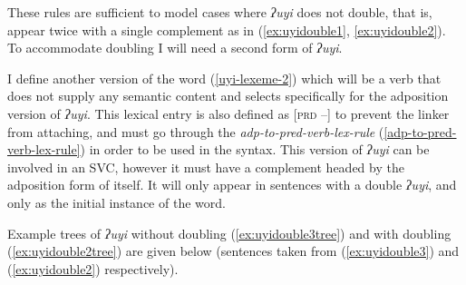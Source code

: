 These rules are sufficient to model cases where \textit{ʔuyi} does not double, that is, appear twice with a single complement as in (\ref{ex:uyidouble1}, \ref{ex:uyidouble2}). To accommodate doubling I will need a second form of \textit{ʔuyi}.

I define another version of the word (\ref{uyi-lexeme-2}) which will be a verb that does not supply any semantic content and selects specifically for the adposition version of \textit{ʔuyi}. This lexical entry is also defined as [\textsc{prd} --] to prevent the linker from attaching, and must go through the {\textit{adp-to-pred-verb-lex-rule}} (\ref{adp-to-pred-verb-lex-rule}) in order to be used in the syntax. This version of \textit{ʔuyi} can be involved in an SVC, however it must have a complement headed by the adposition form of itself. It will only appear in sentences with a double \textit{ʔuyi}, and only as the initial instance of the word.

\begin{singlespacing}
\ex \label{uyi-lexeme-2}
\xe 
\end{singlespacing}

Example trees of \textit{ʔuyi} without doubling (\ref{ex:uyidouble3tree}) and with doubling (\ref{ex:uyidouble2tree}) are given below (sentences taken from (\ref{ex:uyidouble3}) and (\ref{ex:uyidouble2}) respectively).

